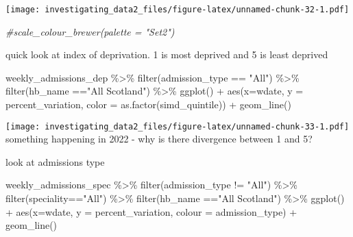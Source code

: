 \documentclass[
]{article}
\newenvironment{Shaded}{\begin{snugshade}}{\end{snugshade}}
\newcommand{\AttributeTok}[1]{\textcolor[rgb]{0.77,0.63,0.00}{#1}}
\newcommand{\CommentTok}[1]{\textcolor[rgb]{0.56,0.35,0.01}{\textit{#1}}}
\newcommand{\FunctionTok}[1]{\textcolor[rgb]{0.00,0.00,0.00}{#1}}
\newcommand{\NormalTok}[1]{#1}
\newcommand{\SpecialCharTok}[1]{\textcolor[rgb]{0.00,0.00,0.00}{#1}}
\newcommand{\StringTok}[1]{\textcolor[rgb]{0.31,0.60,0.02}{#1}}
\begin{document}
\texttt{[image: investigating\_data2\_files/figure-latex/unnamed-chunk-32-1.pdf]}

\begin{Shaded}
\begin{Highlighting}[]
\CommentTok{\#scale\_colour\_brewer(palette = "Set2") }
\end{Highlighting}
\end{Shaded}

quick look at index of deprivation. 1 is most deprived and 5 is least
deprived

\begin{Shaded}
\begin{Highlighting}[]
\NormalTok{weekly\_admissions\_dep }\SpecialCharTok{\%\textgreater{}\%} 
  \FunctionTok{filter}\NormalTok{(admission\_type }\SpecialCharTok{==} \StringTok{"All"}\NormalTok{) }\SpecialCharTok{\%\textgreater{}\%} 
  \FunctionTok{filter}\NormalTok{(hb\_name }\SpecialCharTok{==}\StringTok{"All Scotland"}\NormalTok{) }\SpecialCharTok{\%\textgreater{}\%} 
\FunctionTok{ggplot}\NormalTok{() }\SpecialCharTok{+}
\FunctionTok{aes}\NormalTok{(}\AttributeTok{x=}\NormalTok{wdate, }\AttributeTok{y =}\NormalTok{ percent\_variation, }\AttributeTok{color =} \FunctionTok{as.factor}\NormalTok{(simd\_quintile)) }\SpecialCharTok{+}
\FunctionTok{geom\_line}\NormalTok{() }
\end{Highlighting}
\end{Shaded}

\texttt{[image: investigating\_data2\_files/figure-latex/unnamed-chunk-33-1.pdf]}
something happening in 2022 - why is there divergence between 1 and 5?

look at admissions type

\begin{Shaded}
\begin{Highlighting}[]
\NormalTok{weekly\_admissions\_spec }\SpecialCharTok{\%\textgreater{}\%} 
  \FunctionTok{filter}\NormalTok{(admission\_type }\SpecialCharTok{!=} \StringTok{"All"}\NormalTok{) }\SpecialCharTok{\%\textgreater{}\%} 
  \FunctionTok{filter}\NormalTok{(speciality}\SpecialCharTok{==}\StringTok{"All"}\NormalTok{) }\SpecialCharTok{\%\textgreater{}\%} 
  \FunctionTok{filter}\NormalTok{(hb\_name }\SpecialCharTok{==}\StringTok{"All Scotland"}\NormalTok{) }\SpecialCharTok{\%\textgreater{}\%} 
\FunctionTok{ggplot}\NormalTok{() }\SpecialCharTok{+}
\FunctionTok{aes}\NormalTok{(}\AttributeTok{x=}\NormalTok{wdate, }\AttributeTok{y =}\NormalTok{ percent\_variation, }\AttributeTok{colour =}\NormalTok{ admission\_type) }\SpecialCharTok{+}
\FunctionTok{geom\_line}\NormalTok{()}
\end{Highlighting}
\end{Shaded}
\end{document}
